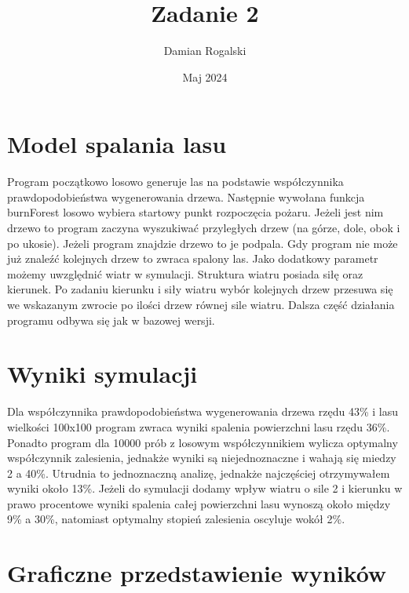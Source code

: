 \documentclass{article}
\title{Zadanie 2}
\author{Damian Rogalski}
\date{Maj 2024}
\begin{document}
\maketitle

\section{Model spalania lasu}
Program początkowo losowo generuje las na podstawie współczynnika prawdopodobieństwa wygenerowania drzewa. Następnie wywołana funkcja burnForest losowo wybiera startowy punkt rozpoczęcia pożaru. Jeżeli jest nim drzewo to program zaczyna wyszukiwać przyległych drzew (na górze, dole, obok i po ukosie). Jeżeli program znajdzie drzewo to je podpala. Gdy program nie może już znaleźć kolejnych drzew to zwraca spalony las. Jako dodatkowy parametr możemy uwzględnić wiatr w symulacji. Struktura wiatru posiada siłę oraz kierunek. Po zadaniu kierunku i siły wiatru wybór kolejnych drzew przesuwa się we wskazanym zwrocie po ilości drzew równej sile wiatru. Dalsza część działania programu odbywa się jak w bazowej wersji. 

\section{Wyniki symulacji}
Dla współczynnika prawdopodobieństwa wygenerowania drzewa rzędu 43\% i lasu wielkości 100x100 program zwraca wyniki spalenia powierzchni lasu rzędu 36\%. Ponadto program dla 10000 prób z losowym współczynnikiem wylicza optymalny współczynnik zalesienia, jednakże wyniki są niejednoznaczne i wahają się miedzy 2 a 40\%. Utrudnia to jednoznaczną analizę, jednakże najczęściej otrzymywałem wyniki około 13\%. Jeżeli do symulacji dodamy wpływ wiatru o sile 2 i kierunku w prawo procentowe wyniki spalenia całej powierzchni lasu wynoszą około między 9\% a 30\%, natomiast optymalny stopień zalesienia oscyluje wokół 2\%.

\newpage

\section{Graficzne przedstawienie wyników}
\end{document}
